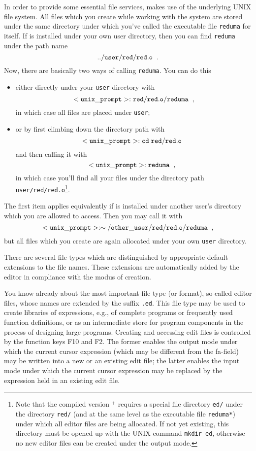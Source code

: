 In order to provide some essential {\mys file services}, \pired makes use of
the underlying UNIX file system. All files which you create while
working with the system are stored under the same directory
under which you've  called the {\mys executable file} {\tt reduma} for
\pired itself. If \pired is installed under your own user
directory,  then you can find {\tt reduma} under the path name
$$
{\tt ../user/red/red.o}\;\;.
$$
Now, there are basically two ways of {\mys calling} {\tt reduma}. You can do this
\begin{itemize}
\item either directly under your {\tt user} directory with
$$
{\tt <unix\_prompt> : red/red.o/reduma}\;\;,
$$
in which case all files are placed under {\tt user};
\item or by first climbing down the directory path with
$$
{\tt <unix\_prompt> : cd\; red/red.o}\;\; 
$$
and then calling it with
$$
{\tt <unix\_prompt> : reduma}\;\;,\;\;
$$
in which case you'll find all your files under the directory
path {\tt user/red/red.o}\footnote{Note that the compiled version
 \pired$^+$ requires a special file directory {\tt ed/} under the 
directory {\tt red/} (and at the same level as the executable file
 {\tt reduma*}) under which all editor files are being allocated.
 If not yet existing, this directory must be opened up with
the UNIX command {\tt mkdir ed}, otherwise no new editor files can be created under the output mode.}.
\end{itemize}

The first item applies equivalently if \pired is installed under another
 user's directory which you
are allowed to access. Then you may call it with
$$
{\tt <unix\_prompt>:\sim/other\_user/red/red.o/reduma}\;\;,
$$
but all files which you create are again allocated under your own
{\tt user} directory. 

There are several {\mys file types} which are distinguished by appropriate
{\mys default extensions} to the file names. These extensions are automatically 
added by the editor in compliance with the modus of creation. 
 
You know already about the most important file type (or format),
 so-called {\mys editor files}, whose names are extended by the suffix 
{\tt .ed}. This file type may be used to create {\mys libraries} of 
\kir expressions, e.g., of complete programs or
frequently used function definitions, 
or as an intermediate store for program 
components in the process of designing large programs. Creating
and accessing edit files is controlled by the function keys
F10 and F2. The former enables the {\mys output mode} under which the
current cursor expression (which
may be different from the {\sc fa}-field) may be written into a
 new or an existing edit file;
the latter enables the {\mys input mode} under which the current
cursor expression may be replaced by the \kir expression held in
an existing edit file. 

